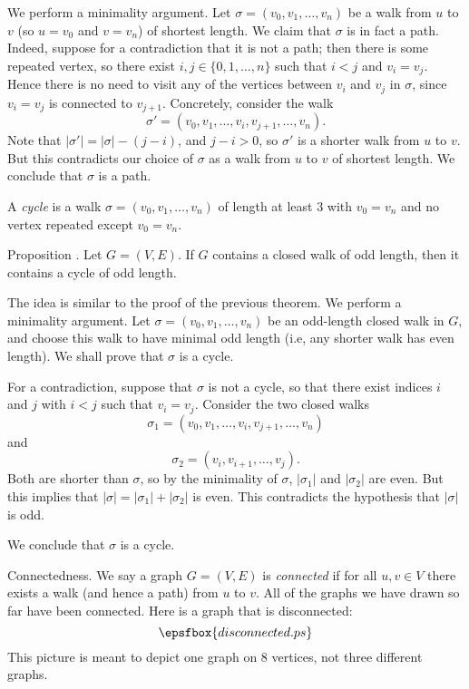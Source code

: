 \proof We perform a minimality argument.
Let $\sigma = (v_0, v_1,\ldots, v_n)$ be a walk from $u$ to $v$ (so
$u = v_0$ and $v = v_n$) of shortest length. We claim that $\sigma$ is in fact a path.
Indeed, suppose for a contradiction that it is not a path; then there is some repeated vertex,
so there exist $i,j\in\{0,1,\ldots,n\}$ such that $i<j$ and $v_i = v_j$. Hence
there is no need to visit any of the vertices between $v_i$ and $v_j$ in $\sigma$,
since $v_i = v_j$ is connected to $v_{j+1}$. Concretely, consider the walk
$$\sigma' = (v_0, v_1,\ldots, v_i, v_{j+1}, \ldots, v_n).$$
Note that $|\sigma'| = |\sigma| - (j-i)$, and $j-i > 0$, so $\sigma'$ is a shorter walk
from $u$ to $v$. But this contradicts our choice of $\sigma$ as a walk from
$u$ to $v$ of shortest length. We conclude that $\sigma$ is a path.\slug

A {\it cycle} is a walk $\sigma = (v_0,v_1,\ldots,v_n)$ of length at least $3$
with $v_0 = v_n$ and no vertex repeated except $v_0 = v_n$.

\edef\propoddwalkoddcycle{\the\thmcount}
\proclaim Proposition \advthm. Let $G = (V,E)$. If $G$ contains a closed walk
of odd length, then it contains a cycle of odd length.

\proof The idea is similar to the proof of the previous theorem. We perform a
minimality argument. Let
$\sigma = (v_0, v_1,\ldots,v_n)$ be an odd-length closed walk in $G$, and choose
this walk to have minimal odd length (i.e, any shorter walk has even length). We shall
prove that $\sigma$ is a cycle.

For a contradiction, suppose that $\sigma$ is not a cycle, so that
there exist indices $i$ and $j$ with $i<j$ such that $v_i = v_j$.
Consider the two closed walks
$$\sigma_1 = (v_0, v_1, \ldots, v_i, v_{j+1}, \ldots, v_n)$$
and
$$\sigma_2 = (v_i, v_{i+1}, \ldots, v_j).$$
Both are shorter than $\sigma$, so by the minimality of $\sigma$,
$|\sigma_1|$ and $|\sigma_2|$ are even. But this implies that
$|\sigma| = |\sigma_1|+|\sigma_2|$ is even. This contradicts the hypothesis that $|\sigma|$
is odd.

We conclude that $\sigma$ is a cycle.\slug

\medskip\boldlabel Connectedness.
We say a graph $G = (V,E)$ is {\it connected} if for all $u,v\in V$ there exists
a walk (and hence a path) from $u$ to $v$. All of the graphs we have
drawn so far have been connected. Here is a graph that is disconnected:
\midinsert
$$\epsfbox{disconnected.ps}$$
\endinsert
\noindent This picture is meant to depict one graph on $8$ vertices, not three
different graphs.

